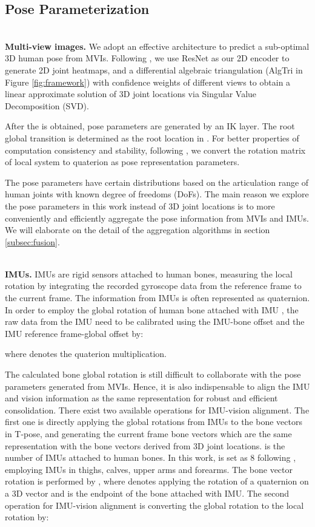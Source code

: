 \documentclass[lettersize,journal]{IEEEtran}
\begin{document}
\subsection{Pose Parameterization}

~\\
\noindent \textbf{Multi-view images.}
\quad We adopt an effective architecture to predict a sub-optimal 3D human pose  from MVIs. Following \cite{iskakov2019learnable}, we use ResNet as our 2D encoder to generate 2D joint heatmaps, and a differential algebraic triangulation (AlgTri in Figure \ref{fig:framework}) with confidence weights of different views to obtain a linear approximate solution of 3D joint locations via Singular Value Decomposition (SVD). 

After the  is obtained, pose parameters are generated by an IK layer. The root global transition  is determined as the root location in . For better properties of computation consistency and stability, following \cite{pavllo2020modeling}, we convert the rotation matrix of local system  to quaterion  as pose representation parameters.

The pose parameters  have certain distributions based on the articulation range of human joints with known degree of freedoms (DoFs). The main reason we explore the pose parameters in this work instead of 3D joint locations is to more conveniently and efficiently aggregate the pose information from MVIs and IMUs. We will elaborate on the detail of the aggregation algorithms in section \ref{subsec:fusion}.

~\\
\noindent \textbf{IMUs.}
\quad IMUs are rigid sensors attached to human bones, measuring the local rotation by integrating the recorded gyroscope data from the reference frame to the current frame. The information from IMUs is often represented as quaternion. In order to employ the global rotation  of human bone attached with IMU , the raw data  from the IMU need to be calibrated using the IMU-bone offset  and the IMU reference frame-global offset  by:

where   denotes the quaterion multiplication.

The calculated bone global rotation  is still difficult to collaborate with the pose parameters generated from MVIs. Hence, it is also indispensable to align the IMU and vision information as the same representation for robust and efficient consolidation. There exist two available operations for IMU-vision alignment. The first one is directly applying the global rotations from IMUs to the bone vectors in T-pose, and generating the current frame bone vectors  which are the same representation with the bone vectors derived from 3D joint locations.  is the number of IMUs attached to human bones. In this work,  is set as 8 following \cite{zhang2020fusing}, employing IMUs in thighs, calves, upper arms and forearms. The bone vector rotation is performed by , where  denotes applying the rotation of a quaternion on a 3D vector and  is the endpoint of the bone  attached with IMU. The second operation for IMU-vision alignment is converting the global rotation  to the local rotation  by:
\end{document}
